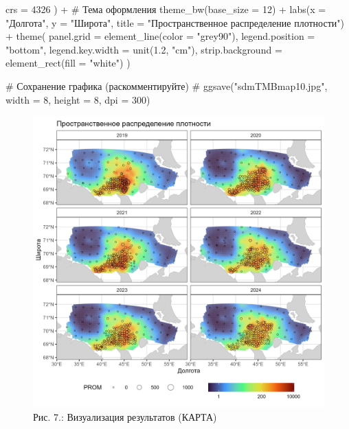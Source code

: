 \documentclass[
  letterpaper,
  DIV=11,
  numbers=noendperiod]{scrreprt}
\newenvironment{Shaded}{\begin{snugshade}}{\end{snugshade}}
\newcommand{\AttributeTok}[1]{\textcolor[rgb]{0.40,0.45,0.13}{#1}}
\newcommand{\CommentTok}[1]{\textcolor[rgb]{0.37,0.37,0.37}{#1}}
\newcommand{\DecValTok}[1]{\textcolor[rgb]{0.68,0.00,0.00}{#1}}
\newcommand{\FloatTok}[1]{\textcolor[rgb]{0.68,0.00,0.00}{#1}}
\newcommand{\FunctionTok}[1]{\textcolor[rgb]{0.28,0.35,0.67}{#1}}
\newcommand{\NormalTok}[1]{\textcolor[rgb]{0.00,0.23,0.31}{#1}}
\newcommand{\SpecialCharTok}[1]{\textcolor[rgb]{0.37,0.37,0.37}{#1}}
\newcommand{\StringTok}[1]{\textcolor[rgb]{0.13,0.47,0.30}{#1}}
\begin{document}
\begin{Shaded}
\begin{Highlighting}[]
    \AttributeTok{crs =} \DecValTok{4326}
\NormalTok{  ) }\SpecialCharTok{+}
  \CommentTok{\# Тема оформления}
  \FunctionTok{theme\_bw}\NormalTok{(}\AttributeTok{base\_size =} \DecValTok{12}\NormalTok{) }\SpecialCharTok{+}
  \FunctionTok{labs}\NormalTok{(}\AttributeTok{x =} \StringTok{"Долгота"}\NormalTok{, }\AttributeTok{y =} \StringTok{"Широта"}\NormalTok{, }\AttributeTok{title =} \StringTok{"Пространственное распределение плотности"}\NormalTok{) }\SpecialCharTok{+}
  \FunctionTok{theme}\NormalTok{(}
    \AttributeTok{panel.grid =} \FunctionTok{element\_line}\NormalTok{(}\AttributeTok{color =} \StringTok{"grey90"}\NormalTok{),}
    \AttributeTok{legend.position =} \StringTok{"bottom"}\NormalTok{,}
    \AttributeTok{legend.key.width =} \FunctionTok{unit}\NormalTok{(}\FloatTok{1.2}\NormalTok{, }\StringTok{"cm"}\NormalTok{),}
    \AttributeTok{strip.background =} \FunctionTok{element\_rect}\NormalTok{(}\AttributeTok{fill =} \StringTok{"white"}\NormalTok{)}
\NormalTok{  )}

\CommentTok{\# Сохранение графика (раскомментируйте)}
\CommentTok{\# ggsave("sdmTMBmap10.jpg", width = 8, height = 8, dpi = 300)}
\end{Highlighting}
\end{Shaded}

\begin{figure}[H]

{\centering \includegraphics[width=0.9\linewidth,height=\textheight,keepaspectratio]{images/sdmTMBmap10.jpg}

}

\caption{Рис. 7.: Визуализация результатов (КАРТА)}

\end{figure}%
\end{document}
